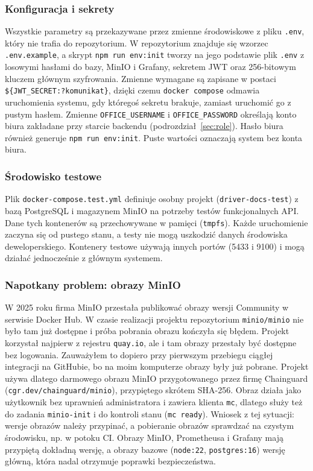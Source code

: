 \subsubsection{Konfiguracja i sekrety}

Wszystkie parametry są przekazywane przez zmienne środowiskowe z pliku
\texttt{.env}, który nie trafia do repozytorium. W repozytorium znajduje się
wzorzec \texttt{.env.example}, a skrypt \texttt{npm run env:init} tworzy na jego
podstawie plik \texttt{.env} z losowymi hasłami do bazy, MinIO i Grafany,
sekretem JWT oraz 256-bitowym kluczem głównym szyfrowania. Zmienne wymagane są
zapisane w postaci \texttt{\$\{JWT\_SECRET:?komunikat\}}, dzięki czemu
\texttt{docker compose} odmawia uruchomienia systemu, gdy któregoś sekretu
brakuje, zamiast uruchomić go z pustym hasłem. Zmienne
\texttt{OFFICE\_USERNAME} i \texttt{OFFICE\_PASSWORD} określają konto biura
zakładane przy starcie backendu (podrozdział~\ref{sec:role}). Hasło biura
również generuje \texttt{npm run env:init}. Puste wartości oznaczają system
bez konta biura.

\subsubsection{Środowisko testowe}

Plik \texttt{docker-compose.test.yml} definiuje osobny projekt
(\texttt{driver-docs-test}) z bazą PostgreSQL i magazynem MinIO na potrzeby
testów funkcjonalnych API. Dane tych kontenerów są przechowywane w pamięci
(\texttt{tmpfs}). Każde uruchomienie zaczyna się od pustego stanu, a testy
nie mogą uszkodzić danych środowiska deweloperskiego. Kontenery testowe
używają innych portów (5433 i 9100) i mogą działać jednocześnie z głównym
systemem.

\subsubsection{Napotkany problem: obrazy MinIO}

W 2025 roku firma MinIO przestała publikować obrazy wersji Community
w serwisie Docker Hub. W czasie realizacji projektu repozytorium
\texttt{minio/minio} nie było tam już dostępne i próba pobrania obrazu kończyła
się błędem. Projekt korzystał najpierw z rejestru \texttt{quay.io}, ale
i tam obrazy przestały być dostępne bez logowania. Zauważyłem to dopiero
przy pierwszym przebiegu ciągłej integracji na GitHubie, bo na moim komputerze
obrazy były już pobrane. Projekt używa dlatego darmowego obrazu MinIO przygotowanego
przez firmę Chainguard (\texttt{cgr.dev/chainguard/minio}), przypiętego skrótem
SHA-256. Obraz działa jako użytkownik bez uprawnień administratora i zawiera
klienta \texttt{mc}, dlatego służy też do zadania \texttt{minio-init}
i do kontroli stanu (\texttt{mc ready}). Wniosek z tej sytuacji: wersje
obrazów należy przypinać, a pobieranie obrazów sprawdzać na czystym
środowisku, np. w potoku CI. Obrazy MinIO, Prometheusa
i Grafany mają przypiętą dokładną wersję, a obrazy bazowe (\texttt{node:22},
\texttt{postgres:16}) wersję główną, która nadal otrzymuje poprawki
bezpieczeństwa.
